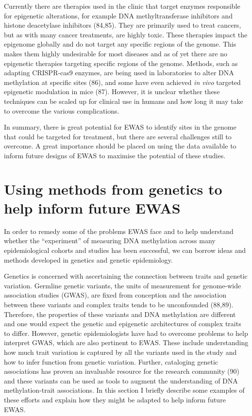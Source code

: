 \documentclass[11pt,oneside]{bristolthesis}
\begin{document}
Currently there are therapies used in the clinic that target enzymes responsible for epigenetic alterations, for example DNA methyltransferase inhibitors and histone deacetylase inhibitors (84,85). They are primarily used to treat cancers, but as with many cancer treatments, are highly toxic. These therapies impact the epigenome globally and do not target any specific regions of the genome. This makes them highly undesirable for most diseases and as of yet there are no epigenetic therapies targeting specific regions of the genome. Methods, such as adapting CRISPR-cas9 enzymes, are being used in laboratories to alter DNA methylation at specific sites (86), and some have even achieved \emph{in vivo} targeted epigenetic modulation in mice (87). However, it is unclear whether these techniques can be scaled up for clinical use in humans and how long it may take to overcome the various complications.

In summary, there is great potential for EWAS to identify sites in the genome that could be targeted for treatment, but there are several challenges still to overcome. A great importance should be placed on using the data available to inform future designs of EWAS to maximise the potential of these studies.

\hypertarget{genetics-in-ewas}{%
\section{Using methods from genetics to help inform future EWAS}\label{genetics-in-ewas}}

In order to remedy some of the problems EWAS face and to help understand whether the ``experiment'' of measuring DNA methylation across many epidemiological cohorts and studies has been successful, we can borrow ideas and methods developed in genetics and genetic epidemiology.

Genetics is concerned with ascertaining the connection between traits and genetic variation. Germline genetic variants, the units of measurement for genome-wide association studies (GWAS), are fixed from conception and the association between these variants and complex traits tends to be unconfounded (88,89). Therefore, the properties of these variants and DNA methylation are different and one would expect the genetic and epigenetic architectures of complex traits to differ. However, genetic epidemiologists have had to overcome problems to help interpret GWAS, which are also pertinent to EWAS. These include understanding how much trait variation is captured by all the variants used in the study and how to infer function from genetic variation. Further, cataloging genetic associations has proven an invaluable resource for the research community (90) and these variants can be used as tools to augment the understanding of DNA methylation-trait associations. In this section I briefly describe some examples of these efforts and explain how they might be adapted to help inform future EWAS.
\end{document}
